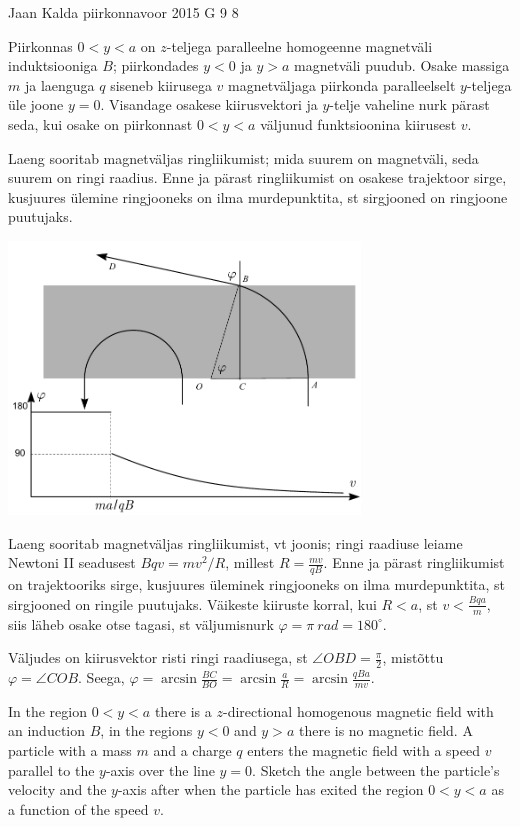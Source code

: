 {Jaan Kalda} %
{piirkonnavoor} %
{2015} %
{G 9} %
{8} %
{
\ifStatement
Piirkonnas $0<y<a$ on $z$-teljega paralleelne homogeenne magnetväli induktsiooniga $B$; piirkondades $y<0$ ja $y>a$ magnetväli puudub. 
Osake massiga $m$ ja laenguga $q$ siseneb kiirusega $v$ magnetväljaga piirkonda paralleelselt $y$-teljega üle joone $y=0$. Visandage osakese kiirusvektori ja $y$-telje vaheline nurk pärast seda, kui osake on piirkonnast $0<y<a$ väljunud funktsioonina kiirusest $v$.
\fi


\ifHint
Laeng sooritab magnetväljas ringliikumist; mida suurem on magnetväli, seda suurem on ringi raadius. Enne ja pärast ringliikumist on osakese trajektoor sirge, kusjuures ülemine ringjooneks on ilma murdepunktita, st sirgjooned on ringjoone puutujaks.
\fi


\ifSolution
\begin{center}
\includegraphics[width=0.7\textwidth]{2015-v2g-09-magnetvalilah}
\end{center}
Laeng sooritab magnetväljas ringliikumist, vt joonis;
ringi raadiuse leiame Newtoni II seadusest $Bqv=mv^2/R$, millest
$R=\frac{mv}{qB}$. Enne ja pärast ringliikumist on trajektooriks sirge, kusjuures üleminek ringjooneks on ilma murdepunktita, st sirgjooned on ringile puutujaks. Väikeste kiiruste korral, kui $R<a$, st $v<\frac{Bqa}{m}$, siis läheb osake otse tagasi,
st väljumisnurk $\varphi=\pi \SI{}{rad}=180^\circ$.

Väljudes on kiirusvektor risti ringi raadiusega, st $\angle OBD=\frac \pi 2$, mistõttu $\varphi=\angle COB$. Seega, $\varphi=\arcsin \frac{BC}{BO}=\arcsin \frac{a}{R}=\arcsin \frac{qBa}{mv}$.
\fi


\ifEngStatement
In the region $0<y<a$ there is a $z$-directional homogenous magnetic field with an induction $B$, in the regions $y<0$ and $y>a$ there is no magnetic field. A particle with a mass $m$ and a charge $q$ enters the magnetic field with a speed $v$ parallel to the $y$-axis over the line $y=0$. Sketch the angle between the particle’s velocity and the $y$-axis after when the particle has exited the region $0<y<a$ as a function of the speed $v$.
\fi


}
